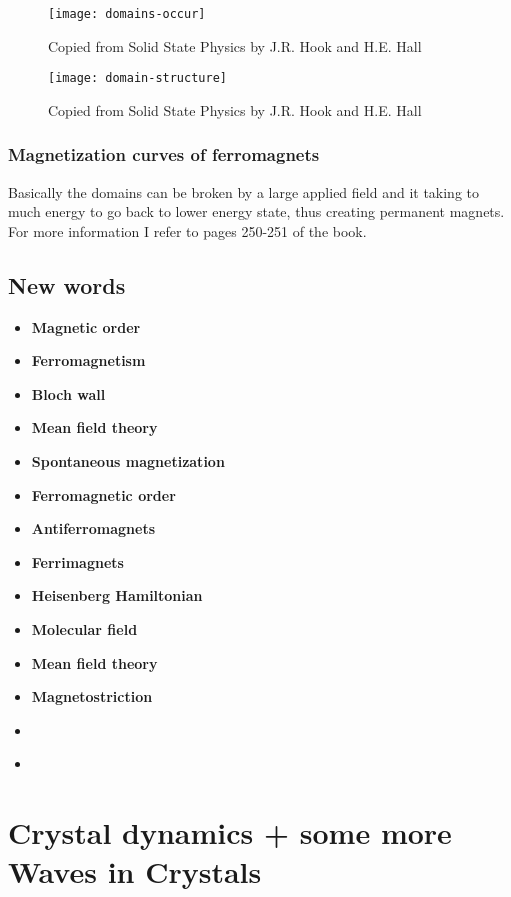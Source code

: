\documentclass[11pt]{article}
\begin{document}
\begin{figure}[!ht]
	\centering
	\texttt{[image: domains-occur]}
	\caption{Copied from Solid State Physics by J.R. Hook and H.E. Hall}
	\label{fig:domains-occur}
\end{figure}

\begin{figure}[!ht]
	\centering
	\texttt{[image: domain-structure]}
	\caption{Copied from Solid State Physics by J.R. Hook and H.E. Hall}
	\label{fig:domain-structure}
\end{figure}

\subsubsection{Magnetization curves of ferromagnets}
Basically the domains can be broken by a large applied field and it taking to much energy to go back to lower energy state, thus creating permanent magnets. For more information I refer to pages 250-251 of the book.


\newpage
\subsection{New words}
\begin{itemize}
	\item \textbf{Magnetic order}
	\item \textbf{Ferromagnetism}
	\item \textbf{Bloch wall}
	\item \textbf{Mean field theory}
	\item \textbf{Spontaneous magnetization}
	\item \textbf{Ferromagnetic order}
	\item \textbf{Antiferromagnets}
	\item \textbf{Ferrimagnets}
	\item \textbf{Heisenberg Hamiltonian}
	\item \textbf{Molecular field}
	\item \textbf{Mean field theory}
	\item \textbf{Magnetostriction}
	\item \textbf{}
	\item \textbf{}
\end{itemize}
\newpage

\section{Crystal dynamics + some more Waves in Crystals}
\end{document}

